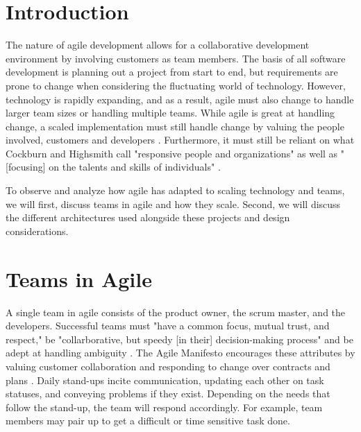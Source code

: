\documentclass[sigplan,screen]{acmart}
\begin{document}

%

%
\maketitle

\section{Introduction}
The nature of agile development allows for a collaborative development environment by involving customers as team members. The basis of all software development is planning out a project from start to end, but requirements are prone to change when considering the fluctuating world of technology. However, technology is rapidly expanding, and as a result, agile must also change to handle larger team sizes or handling multiple teams. While agile is great at handling change, a scaled implementation must still handle change by valuing the people involved, customers and developers \cite{Highsmith01}. Furthermore, it must still be reliant on what Cockburn and Highsmith call "responsive people and organizations" as well as "[focusing] on the talents and skills of individuals" \cite{Cockburn01}. 

To observe and analyze how agile has adapted to scaling technology and teams, we will first, discuss teams in agile and how they scale. Second, we will discuss the different architectures used alongside these projects and design considerations.


\section{Teams in Agile}
A single team in agile consists of the product owner, the scrum master, and the developers. Successful teams must "have a common focus, mutual trust, and respect," be "collarborative, but speedy [in their] decision-making process" and be adept at handling ambiguity \cite{Cockburn01}. The Agile Manifesto encourages these attributes by valuing customer collaboration and responding to change over contracts and plans \cite{Beck01}. Daily stand-ups incite communication, updating each other on task statuses, and conveying problems if they exist. Depending on the needs that follow the stand-up, the team will respond accordingly. For example, team members may pair up to get a difficult or time sensitive task done.
\end{document}
